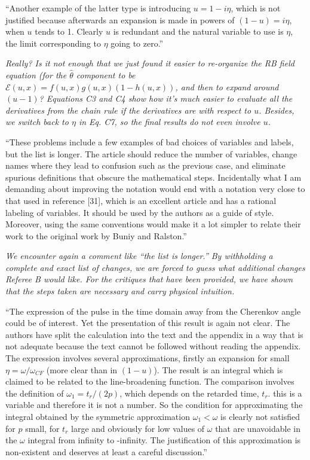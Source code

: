 \documentclass[12pt]{article}
\begin{document}
``Another example of the latter type is introducing $u=1-i \eta$, which is not justified because afterwards an expansion is made in powers of $(1-u)=i \eta$, when $u$ tends to 1. Clearly $u$ is redundant and the natural variable to use is $\eta$, the limit corresponding to $\eta$ going to zero.''

\textit{Really?  Is it not enough that we just found it easier to re-organize the RB field equation (for the $\hat{\theta}$ component to be $\mathcal{E}(u,x) = f(u,x)g(u,x)(1-h(u,x))$, and then to expand around $(u - 1)$?  Equations C3 and C4 show how it's much easier to evaluate all the derivatives from the chain rule if the derivatives are with respect to $u$.  Besides, we switch back to $\eta$ in Eq. C7, so the final results do not even involve $u$.}

``These problems include a few examples of bad choices of variables and labels, but the list is longer. The article should reduce the number of variables, change names where they lead to confusion such as the previous case, and eliminate spurious definitions that obscure the mathematical steps. Incidentally what I am demanding about improving the notation would end with a notation very close to that used in reference [31], which is an excellent article and has a rational labeling of variables. It should be used by the authors as a guide of style. Moreover, using the same conventions would make it a lot simpler to relate their work to the original work by Buniy and Ralston.''

\textit{We encounter again a comment like ``the list is longer.''  By withholding a complete and exact list of changes, we are forced to guess what additional changes Referee B would like.  For the critiques that have been provided, we have shown that the steps taken are necessary and carry physical intuition.}

``The expression of the pulse in the time domain away from the Cherenkov angle could be of interest. Yet the presentation of this result is again not clear. The authors have split the calculation into the text and the appendix in a way that is not adequate because the text cannot be followed without reading the appendix. The expression involves several approximations, firstly an expansion for small $\eta=\omega/\omega_{CF}$ (more clear than in $(1-u)$). The result is an integral which is claimed to be related to the line-broadening function. The comparison involves the definition of $\omega_1=t_r/(2p)$, which depends on the retarded time, $t_r$. this is a variable and therefore it is not a number. So the condition for approximating the integral obtained by the symmetric approximation $\omega_1<\omega$ is clearly not satisfied for $p$ small, for $t_r$ large and obviously for low values of $\omega$ that are unavoidable in the $\omega$ integral from infinity to -infinity. The justification of this approximation is non-existent and deserves at least a careful discussion.''
\end{document}
